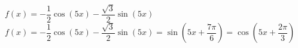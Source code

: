 {$f(x) = -\dfrac{1}{2} \cos(5x) -\dfrac{\sqrt{3}}{2} \sin(5x)$}
{$f(x) = -\dfrac{1}{2} \cos(5x) -\dfrac{\sqrt{3}}{2} \sin(5x) =  \sin\left(5x + \dfrac{7\pi}{6}\right) = \cos\left(5x + \dfrac{2\pi}{3}\right)$}
